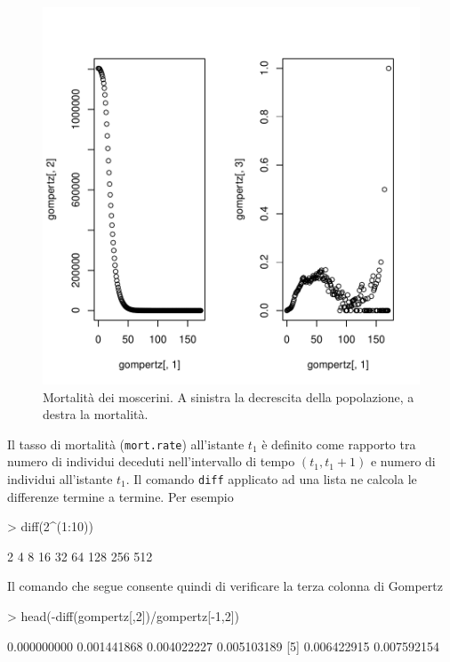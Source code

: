 \documentclass[onecolumn,11pt]{book}
\begin{document}
\begin{figure}\begin{center}
\includegraphics{statisticaconR-341}
\caption{Mortalit\`a dei moscerini. A sinistra la decrescita della popolazione, a destra la mortalit\`a.}
\label{moscerini}
\end{center}
\end{figure}
Il tasso di mortalit\`a (\texttt{mort.rate}) all'istante $t_1$ \`e definito  come rapporto tra numero di individui deceduti nell'intervallo di tempo  $(t_1,t_1+1)$ e  numero di individui all'istante $t_1$. Il comando \texttt{diff}  applicato ad una lista ne calcola le differenze termine a termine.
Per esempio
\begin{Schunk}
\begin{Sinput}
> diff(2^(1:10))
\end{Sinput}
\begin{Soutput}
[1]   2   4   8  16  32  64 128 256 512
\end{Soutput}
\end{Schunk}
Il comando che segue consente quindi di verificare la terza colonna di Gompertz
\begin{Schunk}
\begin{Sinput}
> head(-diff(gompertz[,2])/gompertz[-1,2])
\end{Sinput}
\begin{Soutput}
[1] 0.000000000 0.001441868 0.004022227 0.005103189
[5] 0.006422915 0.007592154
\end{Soutput}
\end{Schunk}
\end{document}
